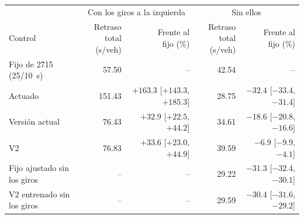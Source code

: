 \begin{tabular}{lrrrr}
\toprule
 & \multicolumn{2}{c}{Con los giros a la izquierda} & \multicolumn{2}{c}{Sin ellos} \\
\cmidrule(lr){2-3}\cmidrule(lr){4-5}
Control & \makecell[r]{Retraso total\\(s/veh)} & \makecell[r]{Frente al\\fijo (\%)} & \makecell[r]{Retraso total\\(s/veh)} & \makecell[r]{Frente al\\fijo (\%)} \\
\midrule
Fijo de 2715 (25/10~s) & 57.50 & -- & 42.54 & -- \\
Actuado & 151.43 & \makecell[r]{$+163.3$\\{}[$+143.3$, $+185.3$]} & 28.75 & \makecell[r]{$-32.4$\\{}[$-33.4$, $-31.4$]} \\
Versión actual & 76.43 & \makecell[r]{$+32.9$\\{}[$+22.5$, $+44.2$]} & 34.61 & \makecell[r]{$-18.6$\\{}[$-20.8$, $-16.6$]} \\
V2 & 76.83 & \makecell[r]{$+33.6$\\{}[$+23.0$, $+44.9$]} & 39.59 & \makecell[r]{$-6.9$\\{}[$-9.9$, $-4.1$]} \\
\addlinespace
Fijo ajustado sin los giros & -- & -- & 29.22 & \makecell[r]{$-31.3$\\{}[$-32.4$, $-30.1$]} \\
V2 entrenado sin los giros & -- & -- & 29.59 & \makecell[r]{$-30.4$\\{}[$-31.6$, $-29.2$]} \\
\bottomrule
\end{tabular}
